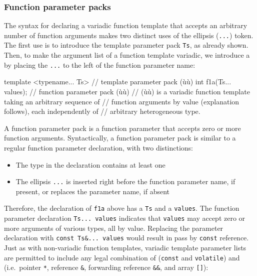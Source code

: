 \subsubsection[Function parameter packs]{Function parameter packs}\label{function-parameter-packs}

The syntax for declaring a variadic function template that accepts an
arbitrary number of function arguments makes two distinct uses of the
ellipsis (\lstinline!...!) token. The first use is to introduce the
template parameter pack \lstinline!Ts!, as already shown. Then, to make the
argument list of a function template variadic, we introduce a
 by placing the \lstinline!...! to the left
of the function parameter name:

\begin{emcppslisting}
template <typename... Ts>  // template parameter pack (ù{}ù)
int f1a(Ts... values);     // function parameter pack (ù{}ù)
   // (ù{}ù) is a variadic function template taking an arbitrary sequence of
   // function arguments by value (explanation follows), each independently of
   // arbitrary heterogeneous type.
\end{emcppslisting}
    

\noindent A function parameter pack is a function parameter that accepts zero or
more function arguments. Syntactically, a function parameter pack is
similar to a regular function parameter declaration, with two
distinctions:
\begin{itemize}
\item{The type in the declaration contains at least one }
\item{The ellipsis \lstinline!...! is inserted right before the function parameter name, if present, or replaces the parameter name, if absent}
\end{itemize}
Therefore, the declaration of \lstinline!f1a! above has a  \lstinline!Ts! and a 
\lstinline!values!. The function parameter declaration
\lstinline!Ts...!~\lstinline!values! indicates that \lstinline!values! may accept
zero or more arguments of various types, all by value. Replacing the
parameter declaration with
\lstinline!const!~\lstinline!Ts&...!~\lstinline!values! would result in pass by
\lstinline!const! reference. Just as with non-variadic function templates,
variadic template parameter lists are permitted to include any legal
combination of  (\lstinline!const! and
\lstinline!volatile!) and  (i.e.~pointer
\lstinline!*!, reference \lstinline!&!, forwarding reference \lstinline!&&!,
and array \lstinline![]!):

